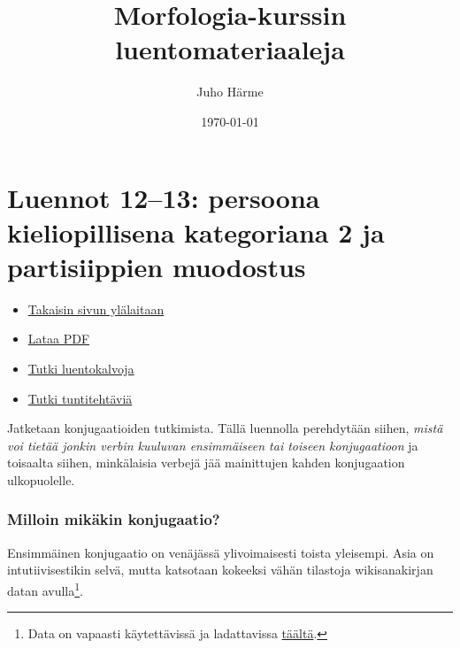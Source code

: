 \documentclass[]{scrartcl}
\author{Juho Härme}
\title{Morfologia-kurssin luentomateriaaleja}
\date{\today}
\providecommand{\tightlist}{%
  \setlength{\itemsep}{0pt}\setlength{\parskip}{0pt}}
\begin{document}
\maketitle
\tableofcontents
\newpage



\section{Luennot 12--13: persoona kieliopillisena kategoriana 2 ja
partisiippien
muodostus}\label{luennot-1213-persoona-kieliopillisena-kategoriana-2-ja-partisiippien-muodostus}

\begin{itemize}
\tightlist
\item
  \href{https://mustikka.uta.fi/~juho_harme/morfologia/\#tästä-kurssista}{Takaisin
  sivun ylälaitaan}
\item
  \href{http://mustikka.uta.fi/~juho_harme/morfologia/materiaalit/luento12.pdf}{Lataa
  PDF}
\item
  \href{http://mustikka.uta.fi/~juho_harme/morfologia/presentations/luento12.html}{Tutki
  luentokalvoja}
\item
  \href{http://mustikka.uta.fi/~juho_harme/morfologia/tehtavat/luento12.pdf}{Tutki
  tuntitehtäviä}
\end{itemize}

Jatketaan konjugaatioiden tutkimista. Tällä luennolla perehdytään
siihen, \emph{mistä voi tietää jonkin verbin kuuluvan ensimmäiseen tai
toiseen konjugaatioon} ja toisaalta siihen, minkälaisia verbejä jää
mainittujen kahden konjugaation ulkopuolelle.

\subsubsection{Milloin mikäkin
konjugaatio?}\label{milloin-mikuxe4kin-konjugaatio}

Ensimmäinen konjugaatio on venäjässä ylivoimaisesti toista yleisempi.
Asia on intutiivisestikin selvä, mutta katsotaan kokeeksi vähän
tilastoja wikisanakirjan datan avulla\footnote{Data on vapaasti
  käytettävissä ja ladattavissa
  \href{https://dumps.wikimedia.org/ruwiktionary}{täältä}.}.
\end{document}
